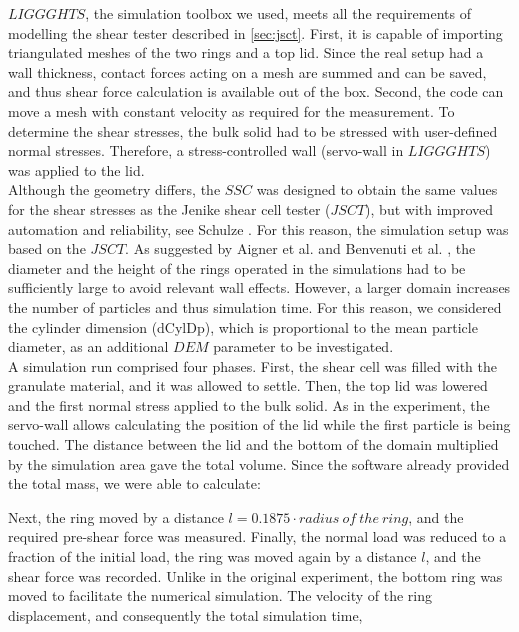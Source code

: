 $LIGGGHTS$, the simulation toolbox we used, meets all the requirements of
modelling the shear tester described in \ref{sec:jsct}. 
First, it is capable of importing triangulated meshes of the two rings and a top lid. 
Since the real setup had a wall thickness, contact forces acting on a mesh are summed and can be saved, 
and thus shear force calculation is available out of the box. 
Second, the code can move a mesh with constant 
velocity as required for the measurement. 
To determine the shear stresses, the bulk solid had to be stressed with 
user-defined normal stresses. 
Therefore, a stress-controlled wall (servo-wall in $LIGGGHTS$) was applied to the lid. \\
Although the geometry differs, the $SSC$ was designed to obtain the same values for the shear stresses as the 
Jenike shear cell tester ($JSCT$), but with improved automation and reliability,
see Schulze \cite{RefWorks:118}. 
For this reason, the simulation setup was
based on the $JSCT$.
As suggested by Aigner et al. \cite{RefWorks:139} and Benvenuti et al. \cite{RefWorks:173}, 
the diameter and the height of the rings operated in the simulations had to be sufficiently large to avoid relevant wall effects. 
However, a larger domain increases the number of particles and thus
simulation time.
For this reason, we considered the cylinder dimension (\ac{dCylDp}), which is
proportional to the mean particle diameter, as an additional $DEM$
parameter to be investigated. \\
A simulation run comprised four phases. 
First, the shear cell was filled with the granulate material, and it was allowed
to settle.
Then, the top lid was lowered and the first normal stress applied to the bulk
solid.
As in the experiment, the servo-wall allows calculating the position of the lid
while the first particle is being touched. 
The distance between the lid and the bottom of the domain multiplied by the 
simulation area gave the total volume.
Since the software already provided the total mass, we were able to calculate:

Next, the ring moved by a distance $l=0.1875 \cdot radius ~of ~the ~ring$, and
the required pre-shear force was measured.
Finally, the normal load was reduced to a fraction of the initial load, 
the ring was moved again by a distance $l$, and the shear force was recorded. 
Unlike in the original experiment, the bottom ring was moved to facilitate the numerical simulation. 
The velocity of the ring displacement, and consequently the total simulation time, 
